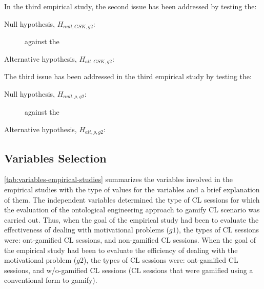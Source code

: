 In the third empirical study, the second issue  has been addressed by testing the:

\begin{description}
\item[Null hypothesis, $H_{null,GSK,g2}$:]
 against the
\item[Alternative hypothesis, $H_{alt,GSK,g2}$:]
\end{description}

The third issue  has been addressed in the third empirical study by testing the:

\begin{description}
\item[Null hypothesis, $H_{null,\rho,g2}$:]
 against the
\item[Alternative hypothesis, $H_{alt,\rho,g2}$:]
\end{description}


\subsection{Variables Selection}

\autoref{tab:variables-empirical-studies} summarizes the variables involved in the empirical studies with the type of values for the variables and a brief explanation of them.
The independent variables  determined the type of CL sessions for which the evaluation of the ontological engineering approach to gamify CL scenario was carried out.
Thus, when the goal of the empirical study had been to evaluate the effectiveness of dealing with motivational problems ($g1$), the types of CL sessions were: 
ont-gamified CL sessions, and non-gamified CL sessions.
When the goal of the empirical study had been to evaluate the efficiency of dealing with the motivational problem ($g2$), the types of CL sessions were: ont-gamified CL sessions, and w/o-gamified CL sessions (CL sessions that were gamified using a conventional form to gamify).

